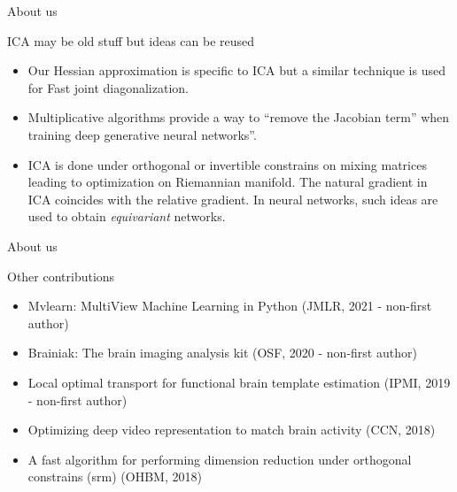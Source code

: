 \documentclass[bigger]{beamer}
\begin{document}
\begin{frame}{About us}
  \begin{block}{ICA may be old stuff but ideas can be reused}
    \begin{itemize}
    \item Our Hessian approximation is specific to ICA but a similar technique
      is used for Fast joint diagonalization.
     \item Multiplicative algorithms provide a way to ``remove the Jacobian term''
       when training deep generative neural networks''.
     \item ICA is done under orthogonal or invertible constrains on mixing
       matrices leading to optimization on Riemannian manifold. The natural
       gradient in ICA coincides with the relative gradient. In neural networks,
       such ideas are used to obtain \emph{equivariant} networks. 
     \end{itemize}
  \end{block}
\end{frame}

  \begin{frame}{About us}
  \begin{block}{Other contributions}
    \begin{itemize}
  \item Mvlearn: MultiView Machine Learning in Python (JMLR,
    2021 - non-first author)
  \item Brainiak: The brain imaging analysis kit (OSF,
    2020 - non-first author)
  \item Local optimal transport for functional brain template estimation (IPMI,
    2019 - non-first author)
  \item Optimizing deep video representation to match brain activity (CCN, 2018)
  \item A fast algorithm for performing dimension reduction under orthogonal
    constrains (srm) (OHBM, 2018)
    \end{itemize}
  \end{block}
\end{frame}
\end{document}
